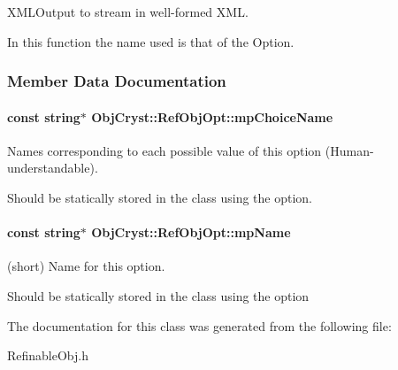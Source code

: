 X\+M\+L\+Output to stream in well-\/formed X\+M\+L. 

In this function the name used is that of the Option. 

\subsubsection{Member Data Documentation}
\paragraph[{mp\+Choice\+Name}]{\setlength{\rightskip}{0pt plus 5cm}const string$\ast$ Obj\+Cryst\+::\+Ref\+Obj\+Opt\+::mp\+Choice\+Name\hspace{0.3cm}{\ttfamily [protected]}}\label{a00084_abc47d0f345c4121b6492e754b30f4fef}


Names corresponding to each possible value of this option (Human-\/understandable). 

Should be statically stored in the class using the option. 
\paragraph[{mp\+Name}]{\setlength{\rightskip}{0pt plus 5cm}const string$\ast$ Obj\+Cryst\+::\+Ref\+Obj\+Opt\+::mp\+Name\hspace{0.3cm}{\ttfamily [protected]}}\label{a00084_a45eb6eed7f6578f438433acddb2f1eb2}


(short) Name for this option. 

Should be statically stored in the class using the option 

The documentation for this class was generated from the following file\+:\begin{DoxyCompactItemize}
\item 
Refinable\+Obj.\+h\end{DoxyCompactItemize}

